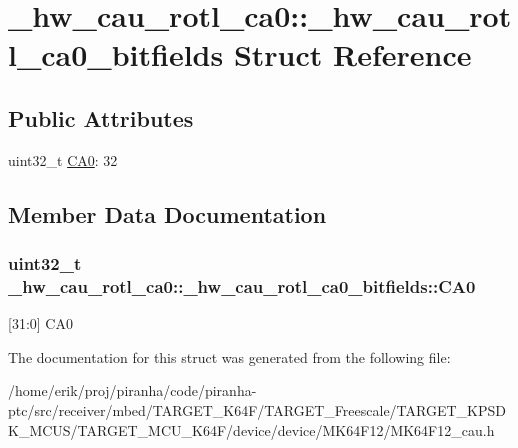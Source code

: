 \hypertarget{struct__hw__cau__rotl__ca0_1_1__hw__cau__rotl__ca0__bitfields}{}\section{\+\_\+hw\+\_\+cau\+\_\+rotl\+\_\+ca0\+:\+:\+\_\+hw\+\_\+cau\+\_\+rotl\+\_\+ca0\+\_\+bitfields Struct Reference}
\label{struct__hw__cau__rotl__ca0_1_1__hw__cau__rotl__ca0__bitfields}
\subsection*{Public Attributes}
\begin{DoxyCompactItemize}
\item 
uint32\+\_\+t \hyperlink{struct__hw__cau__rotl__ca0_1_1__hw__cau__rotl__ca0__bitfields_a275519b74182f682349321936b3e15e3}{C\+A0}\+: 32
\end{DoxyCompactItemize}


\subsection{Member Data Documentation}
\subsubsection[{\texorpdfstring{C\+A0}{CA0}}]{\setlength{\rightskip}{0pt plus 5cm}uint32\+\_\+t \+\_\+hw\+\_\+cau\+\_\+rotl\+\_\+ca0\+::\+\_\+hw\+\_\+cau\+\_\+rotl\+\_\+ca0\+\_\+bitfields\+::\+C\+A0}\hypertarget{struct__hw__cau__rotl__ca0_1_1__hw__cau__rotl__ca0__bitfields_a275519b74182f682349321936b3e15e3}{}\label{struct__hw__cau__rotl__ca0_1_1__hw__cau__rotl__ca0__bitfields_a275519b74182f682349321936b3e15e3}
\mbox{[}31\+:0\mbox{]} C\+A0 

The documentation for this struct was generated from the following file\+:\begin{DoxyCompactItemize}
\item 
/home/erik/proj/piranha/code/piranha-\/ptc/src/receiver/mbed/\+T\+A\+R\+G\+E\+T\+\_\+\+K64\+F/\+T\+A\+R\+G\+E\+T\+\_\+\+Freescale/\+T\+A\+R\+G\+E\+T\+\_\+\+K\+P\+S\+D\+K\+\_\+\+M\+C\+U\+S/\+T\+A\+R\+G\+E\+T\+\_\+\+M\+C\+U\+\_\+\+K64\+F/device/device/\+M\+K64\+F12/M\+K64\+F12\+\_\+cau.\+h\end{DoxyCompactItemize}
